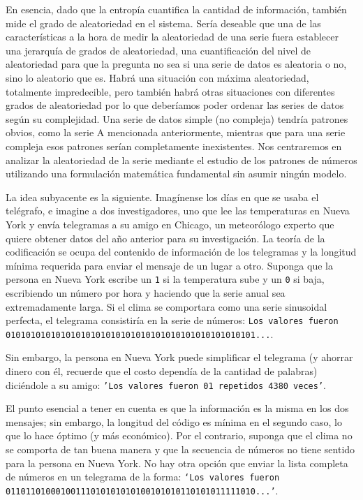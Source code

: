 \documentclass[a4paper,12pt]{article}
\begin{document}
En esencia, dado que la entropía cuantifica la cantidad de información, también mide el grado de aleatoriedad en el sistema. Sería deseable que una de las características a la hora de medir la aleatoriedad de una serie fuera establecer una jerarquía de grados de aleatoriedad, una cuantificación del nivel de aleatoriedad para que la pregunta no sea si una serie de datos es aleatoria o no, sino lo aleatorio que es. Habrá una situación con máxima aleatoriedad, totalmente impredecible, pero también habrá otras situaciones con diferentes grados de aleatoriedad por lo que deberíamos poder ordenar las series de datos según su complejidad. Una serie de datos simple (no compleja) tendría patrones obvios, como la serie A mencionada anteriormente, mientras que para una serie compleja esos patrones serían completamente inexistentes. Nos centraremos en analizar la aleatoriedad de la serie mediante el estudio de los patrones de números utilizando una formulación matemática fundamental sin asumir ningún modelo.

La idea subyacente es la siguiente. Imagínense los días en que se usaba el telégrafo, e imagine a dos investigadores, uno que lee las temperaturas en Nueva York y envía telegramas a su amigo en Chicago, un meteorólogo experto que quiere obtener datos del año anterior para su investigación. La teoría de la codificación se ocupa del contenido de información de los telegramas y la longitud mínima requerida para enviar el mensaje de un lugar a otro. Suponga que la persona en Nueva York escribe un \texttt{1} si la temperatura sube y un \texttt{0} si baja, escribiendo un número por hora y haciendo que la serie anual sea extremadamente larga. Si el clima se comportara como una serie sinusoidal perfecta, el telegrama consistiría en la serie de números:
\texttt{Los valores fueron 01010101010101010101010101010101010101010101010101...}.

Sin embargo, la persona en Nueva York puede simplificar el telegrama (y ahorrar dinero con él, recuerde que el costo dependía de la cantidad de palabras) diciéndole a su amigo:
\texttt{'Los valores fueron 01 repetidos 4380 veces'}. 

El punto esencial a tener en cuenta es que la información es la misma en los dos mensajes; sin embargo, la longitud del código es mínima en el segundo caso, lo que lo hace óptimo (y más económico). Por el contrario, suponga que el clima no se comporta de tan buena manera y que la secuencia de números no tiene sentido para la persona en Nueva York. No hay otra opción que enviar la lista completa de números en un telegrama de la forma: \texttt{`Los valores fueron 01101101000100111010101010100101010110101011111010...'}. 
\end{document}
